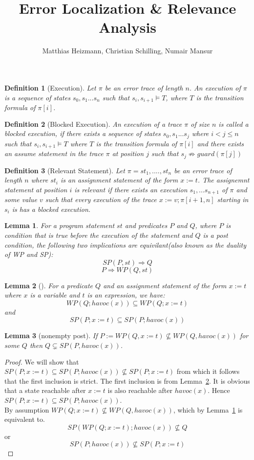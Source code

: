 \documentclass{article}
\title{Error Localization \& Relevance Analysis \\ }
\author{Matthias Heizmann, Christian Schilling, Numair Mansur}
\affil{University of Freiburg, Germany}
\date{\vspace{-5ex}}
\newcommand{\limp}{\Rightarrow}
\newcommand{\WP}[2]{\mathit{WP}(#1,#2)}
\newcommand{\SP}[2]{\mathit{SP}(#1,#2)}
\newcommand{\havoc}{\mathit{havoc}}
\newtheorem{mydef}{Definition}
\newtheorem{lemma}{Lemma}
\begin{document}
\begin{mydef}[Execution]\label{mydef:execution}
Let $\pi$ be an error trace of length $n$. An execution of $\pi$ is a sequence of states $s_0, s_1 ... s_n$ such that $s_i, s_{i+1} \vDash T$, where $T$ is the transition formula of $\pi[i]$.
\end{mydef}
\begin{mydef}[Blocked Execution]\label{mydef:blocked_execution}
An execution of a trace $\pi$ of size $n$ is called a blocked execution, if there exists a sequence of states $s_0,s_1...s_j$ where $i<j \leq n$ such that $s_i, s_{i+1} \vDash T$ where $T$ is the transition formula of $\pi[i]$ and there exists an assume statement in the trace $\pi$ at position $j$ such that $s_j \not \limp guard(\pi[j])$
\end{mydef}

\begin{mydef}[Relevant Statement]\label{mydef:responsible}
Let $\pi = st_1,....,st_n$ be an error trace of length $n$ where $st_i$ is an assignment statement of the form $x:=t$. The assignemnt statement at position $i$ is relevant if there exists an execution $s_1,...s_{n+1}$ of $\pi$ and some value $v$ such that every execution of the trace $x:=v; \pi[i+1,n]$ starting in $s_i$ is has a blocked execution.
\end{mydef}

\begin{lemma}\label{lemma:duality}
For a program statement $st$ and predicates $P$ and $Q$, where $P$ is condition that is true before the execution of the statement and $Q$ is a post condition, the following two implications are equivilant(also known as the duality of WP and SP):
$$SP(P,st) \Rightarrow Q$$
$$P \Rightarrow WP(Q,st)$$
\end{lemma}

\begin{lemma}[]\label{lemma:rel_bw_assignment_and_havoc}
For a predicate $Q$ and an assignment statement of the form $x:=t$ where $x$ is a variable and $t$ is an expression, we have:
$$WP(Q; havoc(x)) \subseteq WP(Q; x:=t)$$
and
$$SP(P;x:=t) \subseteq SP(P;havoc(x))$$
\end{lemma}

\begin{lemma}[nonempty post]\label{lemma:nonempty_post}
	If $P := \WP{Q}{x := t} \nsubseteq \WP{Q}{\havoc(x)}$ for some $Q$ then $Q \subsetneq \SP{P}{\havoc(x)}$.
\end{lemma}
\begin{proof}
	We will show that $SP(P; x:=t) \subseteq SP(P;havoc(x)) \not\subseteq SP(P; x:=t)$ from which it follows that the first inclusion is strict.
	The first inclusion is from Lemma~\ref{lemma:rel_bw_assignment_and_havoc}. It is obvious that a state reachable after $x:=t$ is also reachable 
	after $havoc(x)$. Hence $SP(P; x:=t) \subseteq SP(P;havoc(x))$. \\
	By assumption $WP(Q;x:=t) \not\subseteq \WP{Q}{\havoc(x)}$, which by Lemma~\ref{lemma:duality} is equivalent to.
	$$SP(WP(Q;x:=t); havoc(x)) \not\subseteq Q$$
	or 
	$$SP(P;havoc(x)) \not\subseteq SP(P; x:=t)$$
\end{proof}
\end{document}
